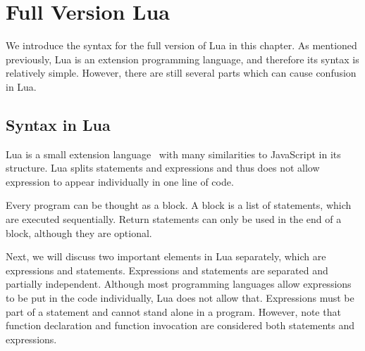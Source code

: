 \chapter{Full Version Lua}
We introduce the syntax for the full version of Lua in this chapter. As mentioned previously, Lua is an extension programming language, and therefore its syntax is relatively simple. However, there are still several parts which can cause confusion in Lua.

\section{Syntax in Lua}
Lua is a small extension language~\cite{PIL} with many similarities to JavaScript in its structure.  Lua splits statements and expressions and thus does not allow expression to appear individually in one line of code.

Every program can be thought as a block. A block is a list of statements, which are executed sequentially. Return statements can only be used in the end of a block, although they are optional.


Next, we will discuss two important elements in Lua separately, which are expressions and statements.
Expressions and statements are separated and partially independent. Although most programming languages allow expressions to be put in the code individually, Lua does not allow that. Expressions must be part of a statement and cannot stand alone in a program.
%
However, note that function declaration and function invocation are considered both statements and expressions.


